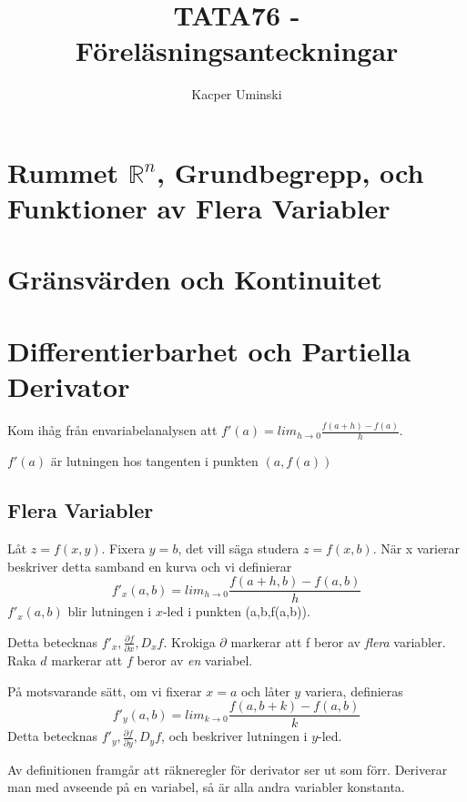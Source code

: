 \documentclass[a4paper,12pt]{article}
\title{TATA76 - Föreläsningsanteckningar}
\author{Kacper Uminski}
\date{}
\newcommand{\partialfrac}[2]{\frac{\partial #1}{\partial #2}}
\begin{document}
\begin{titlepage}
  \clearpage
  \maketitle
  \thispagestyle{empty}
\end{titlepage}
\section{Rummet $\mathbb{R}^n$, Grundbegrepp, och Funktioner av Flera Variabler}
\section{Gränsvärden och Kontinuitet}
\section{Differentierbarhet och Partiella Derivator}
Kom ihåg från envariabelanalysen att
$f'(a) = lim_{h \to 0}\frac{f(a+h)-f(a)}{h}$.

$f'(a)$ är lutningen hos tangenten i punkten $(a,f(a))$
\subsection{Flera Variabler}
Låt $z=f(x,y)$. Fixera $y=b$, det vill säga studera $z=f(x,b)$. När x varierar
beskriver detta samband en kurva och vi definierar
\begin{equation}
  f'_x(a,b) = lim_{h \to 0}\frac{f(a+h,b)-f(a,b)}{h}
\end{equation}
$f'_x(a,b)$ blir lutningen i $x$-led i punkten (a,b,f(a,b)).

Detta betecknas $f'_x, \partialfrac{f}{x}, D_xf$. Krokiga $\partial$
markerar att f beror av \textit{flera} variabler. Raka $d$ markerar att $f$
beror av \textit{en} variabel.

På motsvarande sätt, om vi fixerar $x=a$ och låter $y$ variera, definieras
\begin{equation*}
  f'_y(a,b) = lim_{k \to 0}\frac{f(a,b+k)-f(a,b)}{k}
\end{equation*}
Detta betecknas $f'_y, \partialfrac{f}{y}, D_yf$, och beskriver
lutningen i $y$-led.

Av definitionen framgår att räkneregler för derivator ser ut som förr. Deriverar
man med avseende på en variabel, så är alla andra variabler konstanta.
\end{document}

